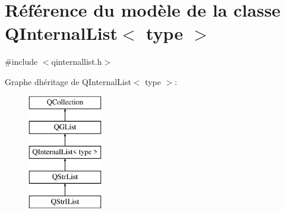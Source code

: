 \hypertarget{class_q_internal_list}{}\section{Référence du modèle de la classe Q\+Internal\+List$<$ type $>$}
\label{class_q_internal_list}


{\ttfamily \#include $<$qinternallist.\+h$>$}

Graphe d\textquotesingle{}héritage de Q\+Internal\+List$<$ type $>$\+:\begin{figure}[H]
\begin{center}
\leavevmode
\includegraphics[height=5.000000cm]{class_q_internal_list}
\end{center}
\end{figure}
